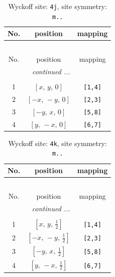 \documentclass[fleqn,8pt]{jsarticle}
\begin{document}
\begin{longtable}{ccc}
\caption{Wyckoff site: {\tt 4j}, site symmetry: {\tt m..}}
 \\
 \hline \hline
No. & position & mapping \\ \hline \endfirsthead

\multicolumn{2}{l}{\tablename\ \thetable{}} \\
 \hline \hline
No. & position & mapping \\ \hline \endhead

 \hline \hline
\multicolumn{2}{r}{\footnotesize\it continued ...} \\ \endfoot

 \hline \hline
\multicolumn{2}{r}{} \\ \endlastfoot

1 & $\left[ x,\, y,\, 0 \right]$ & {\tt [1,4]} \\ \hline
2 & $\left[ - x,\, - y,\, 0 \right]$ & {\tt [2,3]} \\ \hline
3 & $\left[ - y,\, x,\, 0 \right]$ & {\tt [5,8]} \\ \hline
4 & $\left[ y,\, - x,\, 0 \right]$ & {\tt [6,7]} \\
\end{longtable}
\renewcommand{\arraystretch}{1.2}
\begin{longtable}{ccc}
\caption{Wyckoff site: {\tt 4k}, site symmetry: {\tt m..}}
 \\
 \hline \hline
No. & position & mapping \\ \hline \endfirsthead

\multicolumn{2}{l}{\tablename\ \thetable{}} \\
 \hline \hline
No. & position & mapping \\ \hline \endhead

 \hline \hline
\multicolumn{2}{r}{\footnotesize\it continued ...} \\ \endfoot

 \hline \hline
\multicolumn{2}{r}{} \\ \endlastfoot

1 & $\left[ x,\, y,\, \frac{1}{2} \right]$ & {\tt [1,4]} \\ \hline
2 & $\left[ - x,\, - y,\, \frac{1}{2} \right]$ & {\tt [2,3]} \\ \hline
3 & $\left[ - y,\, x,\, \frac{1}{2} \right]$ & {\tt [5,8]} \\ \hline
4 & $\left[ y,\, - x,\, \frac{1}{2} \right]$ & {\tt [6,7]} \\
\end{longtable}
\end{document}
